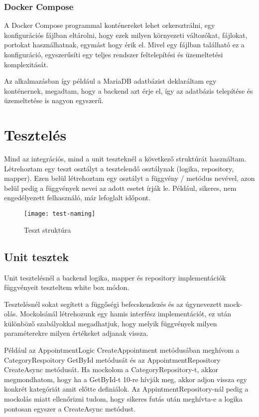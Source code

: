 \subsubsection{Docker Compose}

A Docker Compose programmal konténereket lehet orkersztrálni, egy konfigurációs fájlban eltárolni, hogy ezek milyen környezeti változókat, fájlokat, portokat használhatnak, egymást hogy érik el. Mivel egy fájlban található ez a konfiguráció, egyszerűsíti egy teljes rendszer feltelepítési és üzemeltetési komplexitását.

Az alkalmazásban így például a MariaDB adatbázist deklaráltam egy konténernek, megadtam, hogy a backend azt érje el, így az adatbázis telepítése és üzemeltetése is nagyon egyszerű.

\section{Tesztelés}

Mind az integrációs, mind a unit teszteknél a következő struktúrát használtam. Létrehoztam egy teszt osztályt a tesztelendő osztálynak (logika, repository, mapper). Ezen belül létrehoztam egy osztályt a függvény / metódus nevével, azon belül pedig a függvények nevei az adott esetet írják le. Például, sikeres, nem engedélyezett felhasználó, már lefoglalt időpont.

\begin{figure}[H]
	\centering
	\texttt{[image: test-naming]}
	\caption{Teszt struktúra}
\end{figure}


\subsection{Unit tesztek}
\label{sec:unittests}
Unit tesztelésnél a backend logika, mapper és repository implementációk függvényeit teszteltem white box módon.

Tesztelésnél sokat segített a függőségi befecskendezés és az úgynevezett mock-olás. Mockolsánál létrehozunk egy hamis interfész implementációt, ez után különböző szabályokkal megadhatjuk, hogy melyik függvények milyen paraméterekre milyen értékeket adjanak vissza.

Például az AppointmentLogic CreateAppointment metódusában meghívom a CategoryRespoitory GetById metódusát és az AppointmentRepository CreateAsync metódusát. Ha mockolom a CategoryRepository-t, akkor megmondhatom, hogy ha a GetById-t 10-re hívják meg, akkor adjon vissza egy konkrét kategóriát amit előtte definiálok. Az AppintmentRepository-nál pedig a mockolás miatt ellenőrizni tudom, hogy sikeres futás után meghívta-e a logika pontosan egyszer a CreateAsync metódust.

